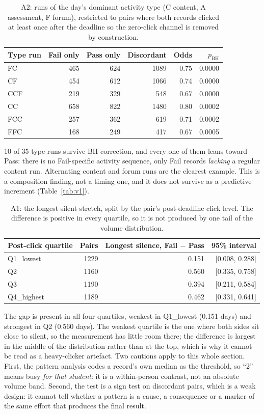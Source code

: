 \documentclass[11pt]{article}
\begin{document}
\begin{table}[t]
\centering
\scriptsize\setlength{\tabcolsep}{4pt}
\begin{tabular}{lrrrrr}
\toprule
Type run & Fail only & Pass only & Discordant & Odds & $p_{\mathrm{BH}}$ \\
\midrule
FC & 465 & 624 & 1089 & 0.75 & 0.0000 \\
CF & 454 & 612 & 1066 & 0.74 & 0.0000 \\
CCF & 219 & 329 & 548 & 0.67 & 0.0000 \\
CC & 658 & 822 & 1480 & 0.80 & 0.0002 \\
FCC & 257 & 362 & 619 & 0.71 & 0.0002 \\
FFC & 168 & 249 & 417 & 0.67 & 0.0005 \\
\bottomrule
\end{tabular}
\caption{A2: runs of the day's dominant activity type (C content, A assessment, F forum), restricted to pairs where both records clicked at least once after the deadline so the zero-click channel is removed by construction.}
\label{tab:a2}
\end{table}
10 of 35 type runs survive BH correction, and every one of them leans toward Pass: there is no Fail-specific activity sequence, only Fail records \emph{lacking} a regular content run. Alternating content and forum runs are the clearest example. This is a composition finding, not a timing one, and it does not survive as a predictive increment (Table~\ref{tab:v1}).
\begin{table}[t]
\centering
\footnotesize
\begin{tabular}{lrrr}
\toprule
Post-click quartile & Pairs & Longest silence, Fail $-$ Pass & 95\% interval \\
\midrule
Q1\_lowest & 1229 & 0.151 & [0.008, 0.288] \\
Q2 & 1160 & 0.560 & [0.335, 0.758] \\
Q3 & 1190 & 0.394 & [0.211, 0.584] \\
Q4\_highest & 1189 & 0.462 & [0.331, 0.641] \\
\bottomrule
\end{tabular}
\caption{A1: the longest silent stretch, split by the pair's post-deadline click level. The difference is positive in every quartile, so it is not produced by one tail of the volume distribution.}
\label{tab:a1}
\end{table}
The gap is present in all four quartiles, weakest in Q1\_lowest (0.151 days) and strongest in Q2 (0.560 days). The weakest quartile is the one where both sides sit close to silent, so the measurement has little room there; the difference is largest in the middle of the distribution rather than at the top, which is why it cannot be read as a heavy-clicker artefact.
Two cautions apply to this whole section. First, the pattern analysis codes a record's own median as the threshold, so ``2'' means busy \emph{for that student}: it is a within-person contrast, not an absolute volume band. Second, the test is a sign test on discordant pairs, which is a weak design: it cannot tell whether a pattern is a cause, a consequence or a marker of the same effort that produces the final result.
\end{document}
